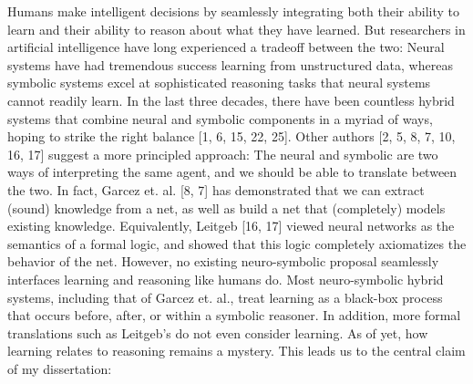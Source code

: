 \documentclass{article}
\begin{document}
Humans make intelligent decisions by seamlessly integrating both their ability
to learn and their ability to reason about what they have learned. But
researchers in artificial intelligence have long experienced a tradeoff
between the two: Neural systems have had tremendous success learning from
unstructured data, whereas symbolic systems excel at sophisticated reasoning
tasks that neural systems cannot readily learn. In the last three decades,
there have been countless hybrid systems that combine neural and symbolic
components in a myriad of ways, hoping to strike the right balance [1, 6, 15,
22, 25]. Other authors [2, 5, 8, 7, 10, 16, 17] suggest a more principled
approach: The neural and symbolic are two ways of interpreting the same agent,
and we should be able to translate between the two. In fact, Garcez et. al.
[8, 7] has demonstrated that we can extract (sound) knowledge from a net, as
well as build a net that (completely) models existing knowledge. Equivalently,
Leitgeb [16, 17] viewed neural networks as the semantics of a formal logic,
and showed that this logic completely axiomatizes the behavior of the net.
However, no existing neuro-symbolic proposal seamlessly interfaces learning
and reasoning like humans do. Most neuro-symbolic hybrid systems, including
that of Garcez et. al., treat learning as a black-box process that occurs
before, after, or within a symbolic reasoner. In addition, more formal
translations such as Leitgeb's do not even consider learning. As of yet, how
learning relates to reasoning remains a mystery. This leads us to the central
claim of my dissertation:
\end{document}
